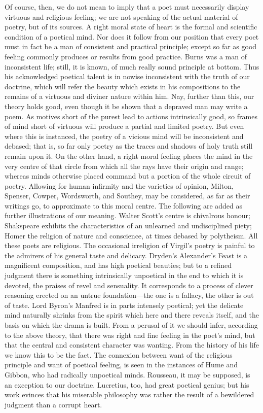 Of course, then, we do not mean to imply that a poet must
necessarily display virtuous and religious feeling; we are not
speaking of the actual material of poetry, but of its sources. A right
moral state of heart is the formal and scientific condition of a
poetical mind. Nor does it follow from our position that every poet
must in fact be a man of consistent and practical principle; except so
far as good feeling commonly produces or results from good practice.
Burns was a man of inconsistent life; still, it is known, of much
really sound principle at bottom. Thus his acknowledged poetical
talent is in nowise inconsistent with the truth of our doctrine, which
will refer the beauty which exists in his compositions to the remains
of a virtuous and diviner nature within him. Nay, further than this,
our theory holds good, even though it be shown that a depraved man may
write a poem. As motives short of the purest lead to actions
intrinsically good, so frames of mind short of virtuous will
produce a partial and limited poetry. But even where this is
instanced, the poetry of a vicious mind will be inconsistent and
debased; that is, so far only poetry as the traces and shadows of holy
truth still remain upon it. On the other hand, a right moral feeling
places the mind in the very centre of that circle from which all the
rays have their origin and range; whereas minds otherwise placed
command but a portion of the whole circuit of poetry. Allowing for
human infirmity and the varieties of opinion, Milton, Spenser, Cowper,
Wordsworth, and Southey, may be considered, as far as their writings
go, to approximate to this moral centre. The following are added as
further illustrations of our meaning. Walter Scott's centre is
chivalrous honour; Shakspeare exhibits the characteristics of an
unlearned and undisciplined piety; Homer the religion of nature and
conscience, at times debased by polytheism. All these poets are
religious. The occasional irreligion of Virgil's poetry is painful to
the admirers of his general taste and delicacy. Dryden's Alexander's
Feast is a magnificent composition, and has high poetical beauties;
but to a refined judgment there is something intrinsically unpoetical
in the end to which it is devoted, the praises of revel and
sensuality. It corresponds to a process of clever reasoning erected on
an untrue foundation—the one is a fallacy, the other is out of
taste. Lord Byron's Manfred is in parts intensely poetical; yet the
delicate mind naturally shrinks from the spirit which here and there
reveals itself, and the basis on which the drama is built. From a
perusal of it we should infer, according to the above theory, that
there was right and fine feeling in the poet's mind, but that the
central and consistent character was wanting. From the history of his
life we know this to be the fact. The connexion between want of
the religious principle and want of poetical feeling, is seen in the
instances of Hume and Gibbon, who had radically unpoetical minds.
Rousseau, it may be supposed, is an exception to our doctrine.
Lucretius, too, had great poetical genius; but his work evinces that
his miserable philosophy was rather the result of a bewildered
judgment than a corrupt heart.

